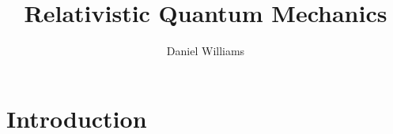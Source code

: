 \documentclass{dwnotes}
\title{Relativistic Quantum Mechanics}
\author{Daniel Williams}
\begin{document}
\maketitle

\chapter{Introduction}
\label{cha:introduction}


\end{document}
